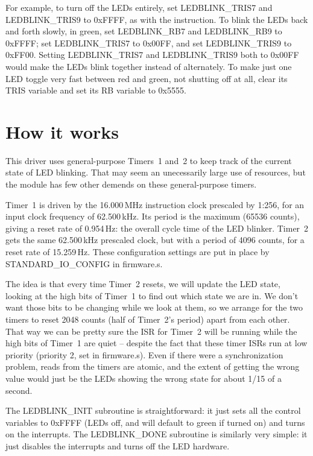 For example, to turn off the LEDs entirely, set LEDBLINK\_TRIS7 and
LEDBLINK\_TRIS9 to 0xFFFF, as with the  instruction.  To
blink the LEDs back and forth slowly, in green, set LEDBLINK\_RB7 and
LEDBLINK\_RB9 to 0xFFFF; set LEDBLINK\_TRIS7 to 0x00FF, and set
LEDBLINK\_TRIS9 to 0xFF00.  Setting LEDBLINK\_TRIS7 and LEDBLINK\_TRIS9 both
to 0x00FF would make the LEDs blink together instead of alternately.  To
make just one LED toggle very fast between red and green, not shutting off
at all, clear its TRIS variable and set its RB variable to 0x5555.

\section{How it works}

This driver uses general-purpose Timers~1 and~2 to keep track of the current
state of LED blinking.  That may seem an unecessarily large use of
resources, but the module has few other demends on these general-purpose
timers.

Timer~1 is driven by the 16.000\,MHz instruction clock prescaled by 1:256,
for an input clock frequency of 62.500\,kHz.  Its period is the maximum
(65536 counts), giving a reset rate of 0.954\,Hz:  the overall cycle time of
the LED blinker.  Timer~2 gets the same 62.500\,kHz prescaled clock, but
with a period of 4096 counts, for a reset rate of 15.259\,Hz.  These
configuration settings are put in place by STANDARD\_IO\_CONFIG in
firmware.s.

The idea is that every time Timer~2 resets, we will update the LED state,
looking at the high bits of Timer~1 to find out which state we are in.  We
don't want those bits to be changing while we look at them, so we arrange
for the two timers to reset 2048 counts (half of Timer~2's period) apart
from each other.  That way we can be pretty sure the ISR for Timer~2 will be
running while the high bits of Timer~1 are quiet -- despite the fact that
these timer ISRs run at low priority (priority 2, set in firmware.s).  Even
if there were a synchronization problem, reads from the timers are atomic,
and the extent of getting the wrong value would just be the LEDs showing the
wrong state for about 1/15 of a second.

The LEDBLINK\_INIT subroutine is straightforward:  it just sets all the
control variables to 0xFFFF (LEDs off, and will default to green if turned
on) and turns on the interrupts.  The LEDBLINK\_DONE subroutine is similarly
very simple:  it just disables the interrupts and turns off the LED
hardware.

